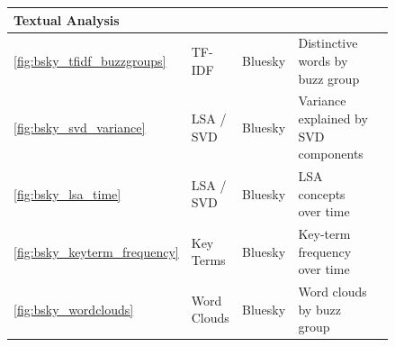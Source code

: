 \begin{longtable}{|p{0.05\linewidth}|p{0.14\linewidth}|p{0.16\linewidth}|p{0.43\linewidth}|p{0.06\linewidth}|}
\multicolumn{5}{|l|}{\rule[-0.3em]{0pt}{1.2em}\textcolor{textprimary}{\sffamily\bfseries\small\enspace 3 \enspace Textual Analysis}} \\
\hline
\textcolor{textmuted}{\small\ref{fig:bsky_tfidf_buzzgroups}}       & \textcolor{textmuted}{\small TF-IDF}           & \textcolor{textmuted}{\small Bluesky}         & \textcolor{textmuted}{\small Distinctive words by buzz group}          & \textcolor{textmuted}{\small\pageref{fig:bsky_tfidf_buzzgroups}} \\\hline
\textcolor{textmuted}{\small\ref{fig:bsky_svd_variance}}           & \textcolor{textmuted}{\small LSA / SVD}        & \textcolor{textmuted}{\small Bluesky}         & \textcolor{textmuted}{\small Variance explained by SVD components}     & \textcolor{textmuted}{\small\pageref{fig:bsky_svd_variance}} \\\hline
\textcolor{textmuted}{\small\ref{fig:bsky_lsa_time}}               & \textcolor{textmuted}{\small LSA / SVD}        & \textcolor{textmuted}{\small Bluesky}         & \textcolor{textmuted}{\small LSA concepts over time}                   & \textcolor{textmuted}{\small\pageref{fig:bsky_lsa_time}} \\\hline
\textcolor{textmuted}{\small\ref{fig:bsky_keyterm_frequency}}      & \textcolor{textmuted}{\small Key Terms}        & \textcolor{textmuted}{\small Bluesky}         & \textcolor{textmuted}{\small Key-term frequency over time}             & \textcolor{textmuted}{\small\pageref{fig:bsky_keyterm_frequency}} \\\hline
\textcolor{textmuted}{\small\ref{fig:bsky_wordclouds}}             & \textcolor{textmuted}{\small Word Clouds}      & \textcolor{textmuted}{\small Bluesky}         & \textcolor{textmuted}{\small Word clouds by buzz group}                & \textcolor{textmuted}{\small\pageref{fig:bsky_wordclouds}} \\\hline


\end{longtable}
